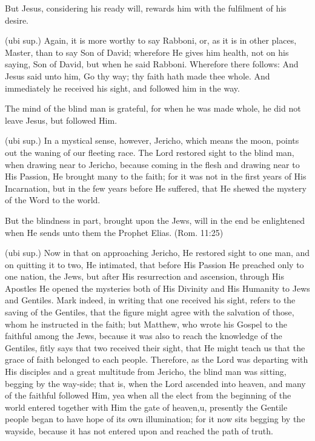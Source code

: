  But Jesus, considering his ready will, rewards him with the fulfilment of his desire.

 (ubi sup.) Again, it is more worthy to say Rabboni, or, as it is in other places, Master, than to say Son of David; wherefore He gives him health, not on his saying, Son of David, but when he said Rabboni. Wherefore there follows: And Jesus said unto him, Go thy way; thy faith hath made thee whole. And immediately he received his sight, and followed him in the way.

 The mind of the blind man is grateful, for when he was made whole, he did not leave Jesus, but followed Him.

 (ubi sup.) In a mystical sense, however, Jericho, which means the moon, points out the waning of our fleeting race. The Lord restored sight to the blind man, when drawing near to Jericho, because coming in the flesh and drawing near to His Passion, He brought many to the faith; for it was not in the first years of His Incarnation, but in the few years before He suffered, that He shewed the mystery of the Word to the world.

 But the blindness in part, brought upon the Jews, will in the end be enlightened when He sends unto them the Prophet Elias. (Rom. 11:25)

 (ubi sup.) Now in that on approaching Jericho, He restored sight to one man, and on quitting it to two, He intimated, that before His Passion He preached only to one nation, the Jews, but after His resurrection and ascension, through His Apostles He opened the mysteries both of His Divinity and His Humanity to Jews and Gentiles. Mark indeed, in writing that one received his sight, refers to the saving of the Gentiles, that the figure might agree with the salvation of those, whom he instructed in the faith; but Matthew, who wrote his Gospel to the faithful among the Jews, because it was also to reach the knowledge of the Gentiles, fitly says that two received their sight, that He might teach us that the grace of faith belonged to each people. Therefore, as the Lord was departing with His disciples and a great multitude from Jericho, the blind man was sitting, begging by the way-side; that is, when the Lord ascended into heaven, and many of the faithful followed Him, yea when all the elect from the beginning of the world entered together with Him the gate of heaven,u, presently the Gentile people began to have hope of its own illumination; for it now sits begging by the wayside, because it has not entered upon and reached the path of truth.

